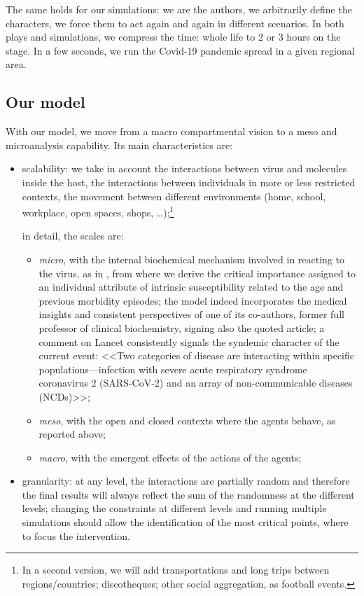 \documentclass[11pt]{article}
\begin{document}
The same holds for our simulations: we are the authors, we arbitrarily define the characters, we force them to act again and again in different scenarios. In both plays and simulations, we compress the time: whole life to 2 or 3 hours on the stage. In a few seconds, we run the Covid-19 pandemic spread in a given regional area.

\subsection{Our model}

With our model, we move from a macro compartmental vision to a meso and microanalysis capability. Its main characteristics are:

\begin{itemize}

\item
scalability: we take in account the interactions between virus and molecules inside the host, the interactions between individuals in more or less restricted contexts, the movement between different environments (home, school, workplace, open spaces, shops, \ldots);\footnote{In a second version, we will add transportations and long trips between regions/countries; discotheques; other social aggregation, as football events.}

in detail, the scales are: 

\begin{itemize}
\setlength\itemsep{0.3em}
\item
	\emph{micro}, with the internal biochemical mechanism involved in reacting to the virus, as in \cite{Silvagno_2020}, from where we derive the critical importance assigned to an individual attribute of intrinsic susceptibility related to the age and previous morbidity episodes; the model indeed incorporates the medical insights and consistent perspectives of one of its co-authors, former full professor of clinical biochemistry, signing also the quoted article; a comment on Lancet \cite{horton2020offline} consistently signals the syndemic character of the current event: <<Two categories of disease are interacting within specific populations---infection with severe acute respiratory syndrome coronavirus 2 (SARS-CoV-2) and an array of non-communicable diseases (NCDs)>>;
\item
	\emph{meso}, with the open and closed contexts where the agents behave, as reported above;
\item	
	\emph{macro}, with the emergent effects of the actions of the agents;
	
\end{itemize}

\item
granularity: at any level, the interactions are partially random and therefore the final results will always reflect the sum of the randomness at the different levels; changing the constraints at different levels and running multiple simulations should allow the identification of the most critical points, where to focus the intervention.

\end{itemize}
\end{document}
